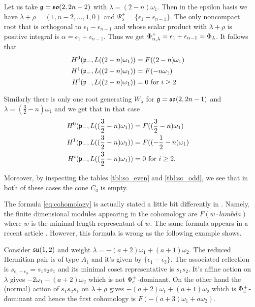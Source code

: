 \begin{example} 
 Let us take $\mathfrak{g} = \mathfrak{so}(2,2n-2)$ with $\lambda = (2-n)\omega_1$. Then in the epsilon basis we have $\lambda + \rho = (1,n-2,\ldots,1,0)$ and $\Psi_\lambda^+ = \{ \epsilon_1 - \epsilon_{n-1}\}$. The only noncompact root that is orthogonal to $\epsilon_1 -  \epsilon_{n-1}$ and whose scalar product with $\lambda + \rho$ is positive integral is $\alpha = \epsilon_1 + \epsilon_{n-1}$. Thus we get $\Phi_{n,\lambda}^+ = \epsilon_1 + \epsilon_{n-1} = \Phi_\lambda$. It follows that
\begin{align*}
 H^0(\mathfrak{p}_-,L((2-n)\omega_1)) &= F((2-n)\omega_1)\\
 H^1(\mathfrak{p}_-,L((2-n)\omega_1)) &= F(-n\omega_1)\\
 H^i(\mathfrak{p}_-,L((2-n)\omega_1)) &= 0 \text{ for } i\geq 2.
\end{align*} 

Similarly there is only one root generating $W_\lambda$ for $\mathfrak{g} = \mathfrak{so}(2,2n-1)$ and $\lambda = (\frac{3}{2} - n)\omega_1$ and we get that in that case
\begin{align*}
 H^0(\mathfrak{p}_-,L((\frac{3}{2}-n)\omega_1)) &= F((\frac{3}{2}-n)\omega_1)\\
 H^1(\mathfrak{p}_-,L((\frac{3}{2}-n)\omega_1)) &= F((-\frac{1}{2}-n)\omega_1)\\
 H^i(\mathfrak{p}_-,L((\frac{3}{2}-n)\omega_1)) &= 0 \text{ for } i\geq 2.
\end{align*}

Moreover, by inspecting the tables \ref{tbl:so_even} and \ref{tbl:so_odd}, we see that in both of these cases the cone $C_a$ is empty.
\end{example}

\begin{remark}
 The formula \eqref{eq:cohomology} is actually stated a little bit differently in \cite{enright_analogues_1988}. Namely, the finite dimensional modules appearing in the cohomology are $F(\overline{w}\cdot lambda)$ where $\overline{w}$ is the minimal length representant of $w$. The same formula appears in a recent article \cite{enright_diagrams_2014}. However, this formula is wrong as the following example shows.

Consider $\mathfrak{su}(1,2)$ and weight $\lambda = -(a+2)\omega_1 + (a+1)\omega_2$. The reduced Hermitian pair is of type $A_1$ and it's given by $\{\epsilon_1 - \epsilon_3 \}$. The associated reflection is $s_{\epsilon_1 - \epsilon_3} = s_1 s_2 s_1$ and its minimal coset representative is $s_1 s_2$. It's affine action on $\lambda$ gives $-2\omega_1 - (a+2)\omega_2$ which is not $\Phi_c^+$-dominant. On the other hand the (normal) action of $s_1 s_2 s_1$ on $\lambda + \rho$ gives $ -(a+2)\omega_1 + (a+1)\omega_2$ which is $\Phi_c^+$-dominant and hence the first cohomology is $F(-(a+3)\omega_1 + a\omega_2).$
\end{remark}


